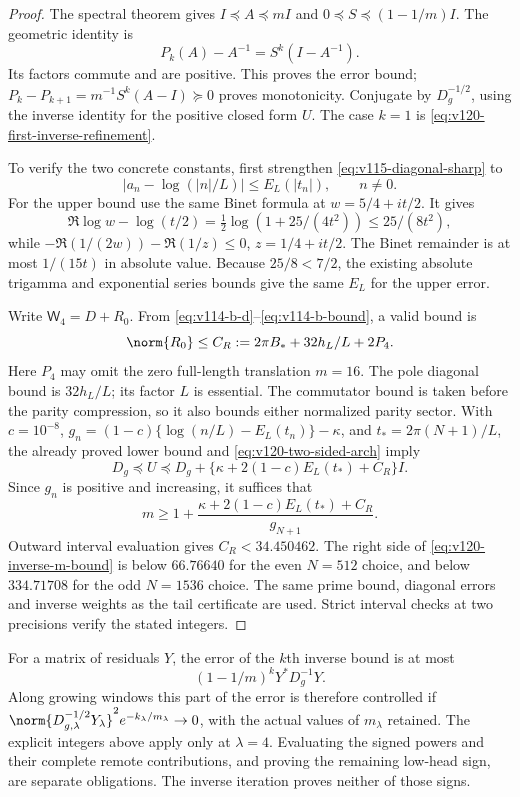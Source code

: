 \begin{proof}
The spectral theorem gives $I\preceq A\preceq mI$ and
$0\preceq S\preceq(1-1/m)I$. The geometric identity is
\[
 P_k(A)-A^{-1}=S^k(I-A^{-1}).
\]
Its factors commute and are positive. This proves the error bound;
$P_k-P_{k+1}=m^{-1}S^k(A-I)\succeq0$ proves monotonicity.
Conjugate by $D_g^{-1/2}$, using the inverse identity for the
positive closed form $U$. The case $k=1$ is
\eqref{eq:v120-first-inverse-refinement}.

To verify the two concrete constants, first strengthen
\eqref{eq:v115-diagonal-sharp} to
\begin{equation}\label{eq:v120-two-sided-arch}
 |a_n-\log(|n|/L)|\le E_L(|t_n|),\qquad n\ne0.
\end{equation}
For the upper bound use the same Binet formula at
$w=5/4+it/2$. It gives
\[
 \Re\log w-\log(t/2)
 =\tfrac12\log(1+25/(4t^2))\le25/(8t^2),
\]
while $-\Re(1/(2w))-\Re(1/z)\le0$, $z=1/4+it/2$.
The Binet remainder is at most $1/(15t)$ in absolute value.
Because $25/8<7/2$, the existing absolute trigamma and exponential
series bounds give the same $E_L$ for the upper error.

Write $\mathsf W_4=D+R_0$. From
\eqref{eq:v114-b-d}--\eqref{eq:v114-b-bound}, a valid bound is
\[
 \norm{R_0}\le C_R:=2\pi B_*+32h_L/L+2P_4.
\]
Here $P_4$ may omit the zero full-length translation $m=16$.
The pole diagonal bound is $32h_L/L$; its factor $L$ is essential.
The commutator bound is taken before the parity compression, so it
also bounds either normalized parity sector. With $c=10^{-8}$,
$g_n=(1-c)\{\log(n/L)-E_L(t_n)\}-\kappa$, and
$t_*=2\pi(N+1)/L$, the already proved lower bound and
\eqref{eq:v120-two-sided-arch} imply
\[
 D_g\preceq U\preceq
 D_g+\{\kappa+2(1-c)E_L(t_*)+C_R\}I.
\]
Since $g_n$ is positive and increasing, it suffices that
\begin{equation}\label{eq:v120-inverse-m-bound}
 m\ge1+\frac{\kappa+2(1-c)E_L(t_*)+C_R}{g_{N+1}}.
\end{equation}
Outward interval evaluation gives $C_R<34.450462$. The right side
of \eqref{eq:v120-inverse-m-bound} is below $66.76640$ for the
even $N=512$ choice, and below $334.71708$ for the odd $N=1536$
choice. The same prime bound, diagonal errors and inverse weights
as the tail certificate are used. Strict interval checks at two
precisions verify the stated integers.
\end{proof}

For a matrix of residuals $Y$, the error of the $k$th inverse bound
is at most
\[
 (1-1/m)^k Y^*D_g^{-1}Y.
\]
Along growing windows this part of the error is therefore controlled
if $\norm{D_{g,\lambda}^{-1/2}Y_\lambda}^2
 e^{-k_\lambda/m_\lambda}\to0$, with the actual values of
$m_\lambda$ retained. The explicit integers above apply only at
$\lambda=4$. Evaluating the signed powers and their complete remote
contributions, and proving the remaining low-head sign, are separate
obligations. The inverse iteration proves neither of those signs.


